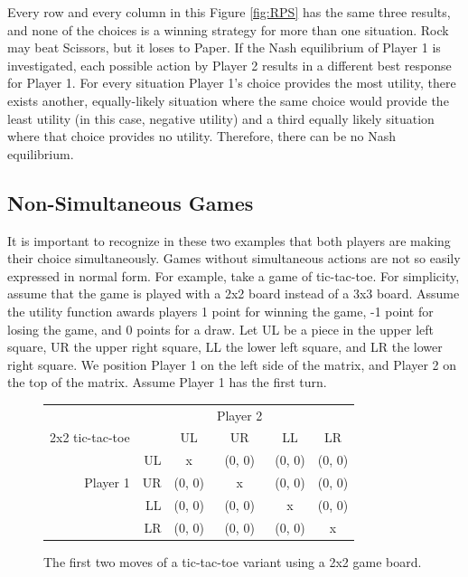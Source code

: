 Every row and every column in this Figure \ref{fig:RPS} has the same three results, and none of the choices is a winning strategy for more than one situation. Rock may beat Scissors, but it loses to Paper. If the Nash equilibrium of Player 1 is investigated, each possible action by Player 2 results in a different best response for Player 1. For every situation Player 1's choice provides the most utility, there exists another, equally-likely situation where the same choice would provide the least utility (in this case, negative utility) and a third equally likely situation where that choice provides no utility. Therefore, there can be no Nash equilibrium.\\



\subsection{Non-Simultaneous Games}
It is important to recognize in these two examples that both players are making their choice simultaneously. Games without simultaneous actions are not so easily expressed in normal form. For example, take a game of tic-tac-toe. For simplicity, assume that the game is played with a 2x2 board instead of a 3x3 board. Assume the utility function awards players 1 point for winning the game, -1 point for losing the game, and 0 points for a draw. Let UL be a piece in the upper left square, UR the upper right square, LL the lower left square, and LR the lower right square. We position Player 1 on the left side of the matrix, and Player 2 on the top of the matrix. Assume Player 1 has the first turn.\\
\begin{figure}[H]
  \centering
  \begin{tabular}{r r | c | c | c | c |}
    &\multicolumn{1}{c}{}&\multicolumn{1}{c}{}&\multicolumn{1}{c}{Player 2}&\multicolumn{1}{c}{}\\
    \multicolumn{1}{c}{2x2 tic-tac-toe}&\multicolumn{1}{c}{}&\multicolumn{1}{c}{UL}&
    \multicolumn{1}{c}{UR}&\multicolumn{1}{c}{LL}&\multicolumn{1}{c}{LR}\\ \cline{3-6}
    & UL & x & (0, 0) & (0, 0) & (0, 0) \\ \cline{3-6}
    Player 1 & UR & (0, 0) & x & (0, 0) & (0, 0) \\ \cline{3-6}
    & LL & (0, 0) & (0, 0) & x & (0, 0) \\ \cline{3-6}
    & LR & (0, 0) & (0, 0) & (0, 0) & x \\ \cline{3-6}
  \end{tabular}
  \caption{The first two moves of a tic-tac-toe variant using a 2x2 game board.}
  \label{fig:2x2TTT}
\end{figure}

